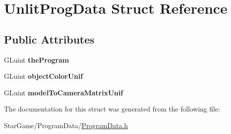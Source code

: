 \hypertarget{struct_unlit_prog_data}{\section{Unlit\-Prog\-Data Struct Reference}
\label{struct_unlit_prog_data}
}
\subsection*{Public Attributes}
\begin{DoxyCompactItemize}
\item 
\hypertarget{struct_unlit_prog_data_a46facbd96d1e2e7c87c4aca0d964e6d2}{G\-Luint {\bfseries the\-Program}}\label{struct_unlit_prog_data_a46facbd96d1e2e7c87c4aca0d964e6d2}

\item 
\hypertarget{struct_unlit_prog_data_a9d767cbf9ea34364464115095d029960}{G\-Luint {\bfseries object\-Color\-Unif}}\label{struct_unlit_prog_data_a9d767cbf9ea34364464115095d029960}

\item 
\hypertarget{struct_unlit_prog_data_a985f88e2e88b4d238a53e5bb8d7eedeb}{G\-Luint {\bfseries model\-To\-Camera\-Matrix\-Unif}}\label{struct_unlit_prog_data_a985f88e2e88b4d238a53e5bb8d7eedeb}

\end{DoxyCompactItemize}


The documentation for this struct was generated from the following file\-:\begin{DoxyCompactItemize}
\item 
Star\-Game/\-Program\-Data/\hyperlink{_program_data_8h}{Program\-Data.\-h}\end{DoxyCompactItemize}
